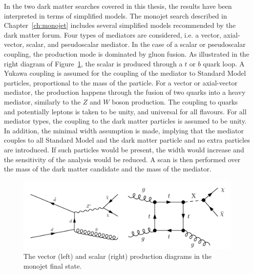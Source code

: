 In the two dark matter searches covered in this thesis, the results have been interpreted in terms of simplified models. The monojet search described in Chapter~\ref{ch:monojet} includes several simplified models recommended by the dark matter forum. Four types of mediators are considered, i.e. a vector, axial-vector, scalar, and pseudoscalar mediator. In the case of a scalar or pseudoscalar coupling, the production mode is dominated by gluon fusion. As illustrated in the right diagram of Figure~\ref{fig:monojet_diagrams}, the scalar is produced through a $t$ or $b$ quark loop. A Yukawa coupling is assumed for the coupling of the mediator to Standard Model particles, proportional to the mass of the particle. For a vector or axial-vector mediator, the production happens through the fusion of two quarks into a heavy mediator, similarly to the $Z$ and $W$ boson production. The coupling to quarks and potentially leptons is taken to be unity, and universal for all flavours. For all mediator types, the coupling to the dark matter particles is assumed to be unity. In addition, the minimal width assumption is made, implying that the mediator couples to all Standard Model and the dark matter particle and no extra particles are introduced. If such particles would be present, the width would increase and the sensitivity of the analysis would be reduced. A scan is then performed over the mass of the dark matter candidate and the mass of the mediator.

\begin{figure}[ht]
  \centering
 \includegraphics[width=.9\textwidth]{monojet_simplifiedmodel.png} 
 \caption{The vector (left) and scalar (right) production diagrams in the monojet final state.}
 \label{fig:monojet_diagrams}
\end{figure}


